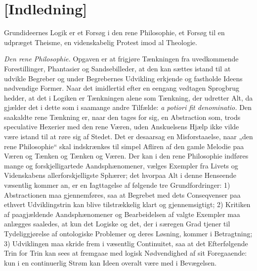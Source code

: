\documentclass[12pt]{book}
\newcommand{\opage}[1]{\marginnote{\footnotesize\textit{[#1]}}}
\begin{document}
\chapter*{[Indledning]}
\opage{[VII]}Grundideernes Logik er et Forsøg i den rene Philosophie, et Forsøg til en udpræget Theisme, en videnskabelig Protest imod al Theologie.

\emph{Den rene Philosophie.} Opgaven er at frigjøre Tænkningen fra uvedkommende Forestillinger, Phantasier og Sandsebilleder, at den kan sættes istand til at udvikle Begreber og under Begrebernes Udvikling erkjende og fastholde Ideens nødvendige Former. Naar det imidlertid efter en eengang vedtagen Sprogbrug hedder, at det i Logiken er Tænkningen alene som Tænkning, der udretter Alt, da gjælder det i dette som i saamange andre Tilfælde: \textit{a potiori fit denominatio.} Den saakaldte rene Tænkning er, naar den tages for sig, en Abstraction som, trods speculative Hexerier med den rene Væren, uden Anskuelsens Hjælp ikke vilde være istand til at røre sig af Stedet. Det er desaarsag en Misforstaaelse, naar „den rene Philosophie“ skal indskrænkes til simpel Afliren af den gamle Melodie paa Væren og Tænken og Tænken og Væren. Der kan i den rene Philosophie indføres mange og forskjelligartede Aandsphænomener, vælges Exempler fra Livets og Videnskabens allerforskjelligste Sphærer; det hvorpaa Alt i denne Henseende væsentlig kommer an, er en Iagttagelse af følgende tre Grundfordringer: 1) Abstractionen maa gjennemføres, saa at Begrebet med dets Conseqvenser paa ethvert Udviklingstrin kan blive tilstrækkelig klart
\opage{VIII}og gjennemsigtigt; 2) Kritiken af paagjældende Aandsphænomener og Bearbeidelsen af valgte Exempler maa anlægges saaledes, at kun det Logiske og det, der i særegen Grad tjener til Tydeliggjørelse af ontologiske Problemer og deres Løsning, kommer i Betragtning; 3) Udviklingen maa skride frem i væsentlig Continuitet, saa at det Efterfølgende Trin for Trin kan sees at fremgaae med logisk Nødvendighed af sit Foregaaende: kun i en continuerlig Strøm kan Ideen overalt være med i Bevægelsen.
\end{document}

